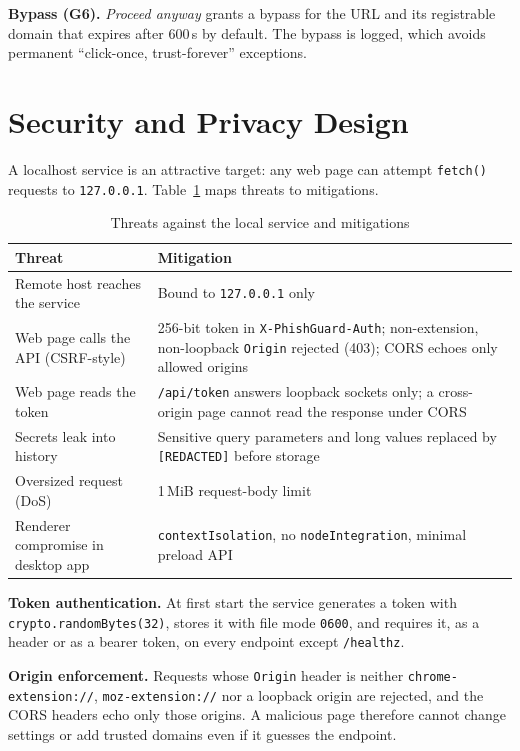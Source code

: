 \documentclass[conference]{IEEEtran}
\newcommand{\code}[1]{\texttt{\small #1}}
\begin{document}
\textbf{Bypass (G6).} \emph{Proceed anyway} grants a bypass for the URL and
its registrable domain that expires after 600\,s by default. The bypass is
logged, which avoids permanent ``click-once, trust-forever'' exceptions.

\section{Security and Privacy Design}
\label{sec:security}

A localhost service is an attractive target: any web page can attempt
\code{fetch()} requests to \code{127.0.0.1}. Table~\ref{tab:threats} maps
threats to mitigations.

\begin{table}[t]
\centering
\caption{Threats against the local service and mitigations}
\label{tab:threats}
\setlength{\tabcolsep}{3pt}
\begin{tabular}{@{}p{}p{}@{}}
\toprule
Threat & Mitigation \\
\midrule
Remote host reaches the service & Bound to \code{127.0.0.1} only \\
Web page calls the API (CSRF-style) & 256-bit token in \code{X-PhishGuard-Auth}; non-extension, non-loopback \code{Origin} rejected (403); CORS echoes only allowed origins \\
Web page reads the token & \code{/api/token} answers loopback sockets only; a cross-origin page cannot read the response under CORS \\
Secrets leak into history & Sensitive query parameters and long values replaced by \code{[REDACTED]} before storage \\
Oversized request (DoS) & 1\,MiB request-body limit \\
Renderer compromise in desktop app & \code{contextIsolation}, no \code{nodeIntegration}, minimal preload API \\
\bottomrule
\end{tabular}
\end{table}

\textbf{Token authentication.} At first start the service generates a
token with \code{crypto.randomBytes(32)}, stores it with file mode
\code{0600}, and requires it, as a header or as a bearer token, on every
endpoint except \code{/healthz}.

\textbf{Origin enforcement.} Requests whose \code{Origin} header is neither
\code{chrome-extension://}, \code{moz-extension://} nor a loopback origin are
rejected, and the CORS headers echo only those origins. A malicious page
therefore cannot change settings or add trusted domains even if it guesses
the endpoint.
\end{document}

